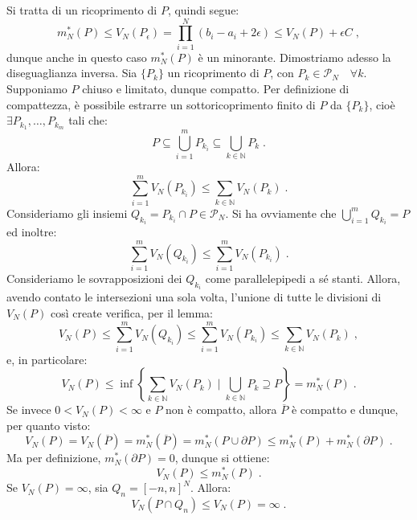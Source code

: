 \documentclass[a4paper,12pt]{report}
\theoremstyle{plain}
\theoremstyle{definition}
\theoremstyle{remark}
\numberwithin{equation}{section}
\begin{document}
Si tratta di un ricoprimento di $P$, quindi segue:
\begin{equation}
m_N^*(P) \le V_N(P_{\epsilon})=\prod_{i=1}^N (b_i-a_i+2\epsilon) \le V_N(P)+\epsilon C\;,
\end{equation}
dunque anche in questo caso $m_N^*(P)$ è un minorante. Dimostriamo adesso la diseguaglianza inversa. Sia $\{P_k\}$ un ricoprimento di $P$, con $P_k \in \mathcal{P}_N\quad \forall k$. Supponiamo $P$ chiuso e limitato, dunque compatto. Per definizione di compattezza, è 
possibile estrarre un sottoricoprimento finito di $P$ da $\{P_k\}$, cioè $\exists P_{k_1},\ldots,P_{k_m}$ tali che:
\begin{equation}
P \subseteq \bigcup_{i=1}^m P_{k_i} \subseteq \bigcup_{k \in \mathbb{N}} P_k\;.
\end{equation}
Allora:
\begin{equation}
\sum_{i=1}^m V_N(P_{k_i}) \le \sum_{k \in \mathbb{N}} V_N(P_k)\;.
\end{equation}
Consideriamo gli insiemi $Q_{k_i}=P_{k_i} \cap P \in \mathcal{P}_N$. Si ha ovviamente che $\bigcup_{i=1}^m Q_{k_i} = P$ ed inoltre:
\begin{equation}
\sum_{i=1}^m V_N(Q_{k_i})\le \sum_{i=1}^m V_N(P_{k_i})\;.
\end{equation}
Consideriamo le sovrapposizioni dei $Q_{k_i}$ come parallelepipedi a sé stanti. Allora, avendo contato le intersezioni una sola volta, 
l'unione di tutte le divisioni di $V_N(P)$ così create verifica, per il lemma:
\begin{equation}
V_N(P) \le \sum_{i=1}^m V_N(Q_{k_i}) \le \sum_{i=1}^m V_N(P_{k_i}) \le \sum_{k \in \mathbb{N}} V_N(P_k)\;,
\end{equation}
e, in particolare:
\begin{equation}
V_N(P) \le \inf\left\{\sum_{k \in \mathbb{N}} V_N(P_k)\;|\; \bigcup_{k \in \mathbb{N}} P_k \supseteq P\right\}=m_N^*(P)\;.
\end{equation}
Se invece $0<V_N(P)<\infty$ e $P$ non è compatto, allora $\overline{P}$ è compatto e dunque, per quanto visto:
\begin{equation}
V_N(P)=V_N(\overline{P})=m_N^*(\overline{P})=m_N^*(P\cup \partial P) \le m_N^*(P)+m_N^*(\partial P)\;.
\end{equation}
Ma per definizione, $m_N^*(\partial P)=0$, dunque si ottiene:
\begin{equation}
V_N(P) \le m_N^*(P)\;.
\end{equation}
Se $V_N(P)=\infty$, sia $Q_n=[-n,n]^{N}$. Allora:
\begin{equation}
V_N(P \cap Q_n) \le V_N(P)=\infty\;.
\end{equation}
\end{document}
